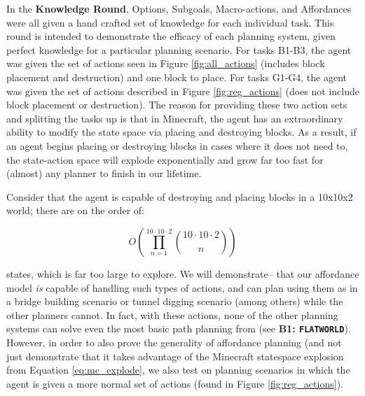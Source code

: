 \documentclass[]{article}
\begin{document}


In the {\bf Knowledge Round}, Options, Subgoals, Macro-actions, and Affordances were all given a hand crafted set of knowledge for each individual task. This round is intended to demonstrate the efficacy of each planning system, given perfect knowledge for a particular planning scenario. For tasks B1-B3, the agent was given the set of actions seen in Figure \ref{fig:all_actions} (includes block placement and destruction) and one block to place. For tasks G1-G4, the agent was given the set of actions described in Figure \ref{fig:reg_actions} (does not include block placement or destruction). The reason for providing these two action sets and splitting the tasks up is that in Minecraft, the agent has an extraordinary ability to modify the state space via placing and destroying blocks. As a result, if an agent begins placing or destroying blocks in cases where it does not need to, the state-action space will explode exponentially and grow far too fast for (almost) any planner to finish in our lifetime. 

Consider that the agent is capable of destroying and placing blocks in a 10x10x2 world; there are on the order of:

\begin{equation}
O\left(\prod_{n=1}^{10 \cdot 10 \cdot 2} \binom{10 \cdot 10 \cdot 2}{n}\right)
\label{eq:mc_explode}
\end{equation}

states, which is far too large to explore. We will demonstrate-- that our affordance model {\it is} capable of handling such types of actions, and can plan using them as in a bridge building scenario or tunnel digging scenario (among others) while the other planners cannot. In fact, with these actions, none of the other planning systems can solve even the most basic path planning from (see {\bf B1: \texttt{FLATWORLD}}). However, in order to also prove the generality of affordance planning (and not just demonstrate that it takes advantage of the Minecraft statespace explosion from Equation \ref{eq:mc_explode}, we also test on planning scenarios in which the agent is given a more normal set of actions (found in Figure \ref{fig:reg_actions}).
\end{document}
